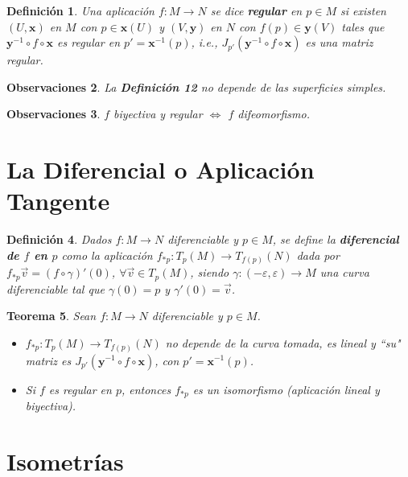 \documentclass[ebook,oneside]{memoir}
\newtheorem{thm}{Teorema}[chapter]
\newtheorem{defn}[thm]{Definición}
\newtheorem{rem}[thm]{Observaciones}
\begin{document}
\begin{defn}
Una aplicaci\'on $f: M\rightarrow N$ se dice \textbf{regular} en $p\in M$ si existen $(U,\textbf{x})$ en $M$ con $p \in \textbf{x}(U)$ y $(V,\textbf{y})$ en $N$ con $f(p) \in \textbf{y}(V)$ tales que $\textbf{y}^{-1}\circ f \circ \textbf{x}$ es regular en $p' = \textbf{x}^{-1}(p)$, i.e., $J_{p'}(\textbf{y}^{-1}\circ f \circ \textbf{x})$ es una matriz regular.
\end{defn}

\begin{rem}
La \textup{\textbf{Definici\'on 12}} no depende de las superficies simples.
\end{rem}

\begin{rem}
$f$ biyectiva y regular $\Leftrightarrow$ $f$ difeomorfismo.
\end{rem}

\section{La Diferencial o Aplicaci\'on Tangente}

\begin{defn}
Dados $f:M \to N$ diferenciable y $p\in M$, se define la \textbf{diferencial de $f$ en $p$} como la aplicaci\'on $f_{*p}: T_p (M)\rightarrow T_{f(p)}(N)$ dada por $f_{*p}\overrightarrow{v}=(f\circ\gamma)'(0)$, $\forall \overrightarrow{v}\in T_p(M)$, siendo $\gamma:(-\varepsilon,\varepsilon)\to M$ una curva diferenciable tal que $\gamma(0)=p$ y $\gamma'(0)=\overrightarrow{v}$.
\end{defn}


\begin{thm}
Sean $f:M\rightarrow N$ diferenciable y $p\in M$.
\begin{itemize}

\item [a)]
$f_{*p}: T_p (M)\rightarrow T_{f(p)}(N)$ no depende de la curva tomada, es lineal y ``su" matriz es $J_{p'}(\textbf{y}^{-1}\circ f \circ \textbf{x})$, con $p'= \textbf{x}^{-1}(p)$.
\item [b)]
Si $f$ es regular en $p$, entonces $f_{*p}$ es un isomorfismo (aplicaci\'on lineal y biyectiva).
\end{itemize}
\end{thm}

\section{Isometr\'ias}
\end{document}
